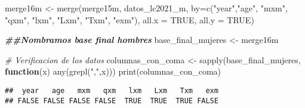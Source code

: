 \documentclass[
]{article}
\newenvironment{Shaded}{\begin{snugshade}}{\end{snugshade}}
\newcommand{\AttributeTok}[1]{\textcolor[rgb]{0.77,0.63,0.00}{#1}}
\newcommand{\CommentTok}[1]{\textcolor[rgb]{0.56,0.35,0.01}{\textit{#1}}}
\newcommand{\ConstantTok}[1]{\textcolor[rgb]{0.00,0.00,0.00}{#1}}
\newcommand{\ControlFlowTok}[1]{\textcolor[rgb]{0.13,0.29,0.53}{\textbf{#1}}}
\newcommand{\DocumentationTok}[1]{\textcolor[rgb]{0.56,0.35,0.01}{\textbf{\textit{#1}}}}
\newcommand{\FunctionTok}[1]{\textcolor[rgb]{0.00,0.00,0.00}{#1}}
\newcommand{\NormalTok}[1]{#1}
\newcommand{\OtherTok}[1]{\textcolor[rgb]{0.56,0.35,0.01}{#1}}
\newcommand{\StringTok}[1]{\textcolor[rgb]{0.31,0.60,0.02}{#1}}
\begin{document}
\begin{Shaded}
\begin{Highlighting}[]
\NormalTok{merge16m }\OtherTok{\textless{}{-}} \FunctionTok{merge}\NormalTok{(merge15m, datos\_lc2021\_m, }\AttributeTok{by=}\FunctionTok{c}\NormalTok{(}\StringTok{"year"}\NormalTok{,}\StringTok{"age"}\NormalTok{, }\StringTok{"mxm"}\NormalTok{, }\StringTok{"qxm"}\NormalTok{, }\StringTok{"lxm"}\NormalTok{, }\StringTok{"Lxm"}\NormalTok{, }\StringTok{"Txm"}\NormalTok{, }\StringTok{"exm"}\NormalTok{), }\AttributeTok{all.x =} \ConstantTok{TRUE}\NormalTok{, }\AttributeTok{all.y =} \ConstantTok{TRUE}\NormalTok{)}


\DocumentationTok{\#\#Nombramos base final hombres}
\NormalTok{base\_final\_mujeres }\OtherTok{\textless{}{-}}\NormalTok{ merge16m}

\CommentTok{\# Verificacion de los datos }
\NormalTok{columnas\_con\_coma }\OtherTok{\textless{}{-}} \FunctionTok{sapply}\NormalTok{(base\_final\_mujeres, }\ControlFlowTok{function}\NormalTok{(x) }\FunctionTok{any}\NormalTok{(}\FunctionTok{grepl}\NormalTok{(}\StringTok{","}\NormalTok{,x)))}
\FunctionTok{print}\NormalTok{(columnas\_con\_coma)}
\end{Highlighting}
\end{Shaded}

\begin{verbatim}
##  year   age   mxm   qxm   lxm   Lxm   Txm   exm 
## FALSE FALSE FALSE FALSE  TRUE  TRUE  TRUE FALSE
\end{verbatim}
\end{document}

